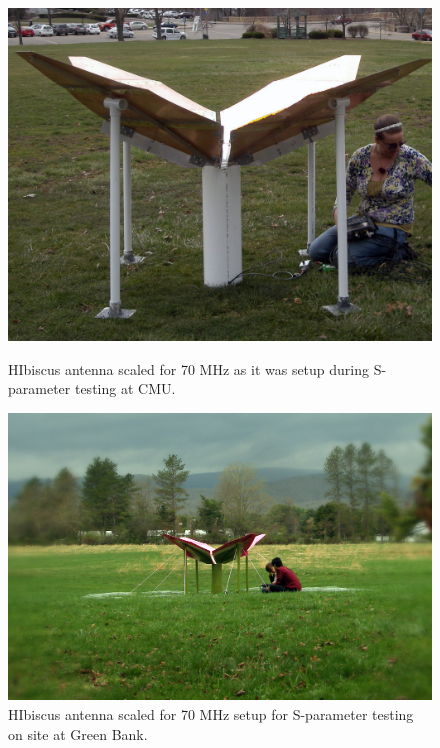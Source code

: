 \begin{figure}[htb]
\centering
\begin{minipage}[b]{0.43\textwidth}
\centering
\includegraphics[width=0.95\linewidth]{SCIHI_system/figures/HIbiscus_pgh_imp.jpg}
\caption{HIbiscus antenna scaled for 70 MHz as it was setup during S-parameter testing at CMU. }
\label{Fig:hibiscus_first}
\end{minipage}%
\begin{minipage}[b]{0.02\textwidth}
\hspace{1cm}
\end{minipage}%
\begin{minipage}[b]{0.51\textwidth}
\centering
\includegraphics[width=0.95\linewidth]{SCIHI_system/figures/HIbiscus_gbt.jpg}
\caption{HIbiscus antenna scaled for 70 MHz setup for S-parameter testing on site at Green Bank.}
\label{Fig:hibiscus_gbt}
\end{minipage}
\end{figure}


